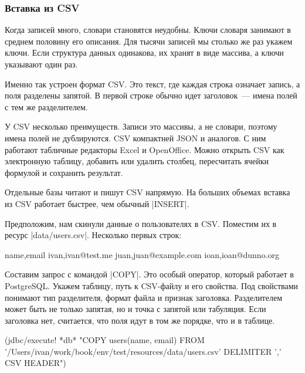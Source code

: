 \subsubsection*{Вставка из CSV}

Когда записей много, словари становятся неудобны. Ключи словаря занимают в
среднем половину его описания. Для тысячи записей мы столько же раз укажем
ключи. Если структура данных одинакова, их хранят в виде массива, а ключи
указывают один раз.

Именно так устроен формат CSV.
Это текст, где каждая строка означает запись, а поля разделены запятой.
В первой строке обычно идет заголовок~--- имена полей с тем же разделителем.

У CSV несколько преимуществ. Записи это массивы, а не словари, поэтому имена
полей не дублируются. CSV компактней JSON и аналогов. С ним работают табличные
редакторы Excel и OpenOffice. Можно открыть CSV как электронную таблицу,
добавить или удалить столбец, пересчитать ячейки формулой и сохранить результат.

Отдельные базы читают и пишут CSV напрямую. На больших объемах вставка из CSV
работает быстрее, чем обычный \spverb|INSERT|.

Предположим, нам скинули данные о пользователях в CSV. Поместим их в ресурс
\spverb|data/users.csv|. Несколько первых строк:

\begin{english}
  \begin{text}
name,email
ivan,ivan@test.me
juan,juan@example.com
ioan,ioan@dunno.org
  \end{text}
\end{english}

Составим запрос с командой \spverb|COPY|. Это особый оператор, который работает
в PostgreSQL. Укажем таблицу, путь к CSV-файлу и его свойства. Под свойствами
понимают тип разделителя, формат файла и признак заголовка. Разделителем может
быть не только запятая, но и точка с запятой или табуляция. Если заголовка нет,
считается, что поля идут в том же порядке, что и в таблице.

\begin{english}
  \begin{clojure}
(jdbc/execute! *db*
 "COPY users(name, email)
  FROM '/Users/ivan/work/book/env/test/resources/data/users.csv'
  DELIMITER ',' CSV HEADER")
  \end{clojure}
\end{english}


